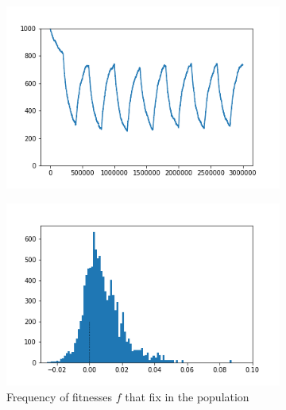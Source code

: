 \documentclass{article}
\begin{document}
\begin{figure}[h]
	\centering
	\begin{subfigure}[t]{0.305\linewidth}
		\centering
		\includegraphics[width = 1.0\linewidth, trim={5 5 40 30}, clip=true]{figures/changing_selection_trajec.png}
		\label{fig:changing_constant_trajec}	
	\end{subfigure}
	\hspace{0.03\linewidth}
	\begin{subfigure}[t]{0.305\linewidth}
		\centering
		\includegraphics[width = 1.0\linewidth, trim={10 5 40 30}, clip=true]{figures/changing_selection_hist2.png}
		\caption{Frequency of fitnesses $f$ that fix in the population}
		\label{fig:changing_constant_hist}
	\hspace{0.03\linewidth}
	\end{subfigure}
	\begin{subfigure}[t]{0.305\linewidth}

\end{subfigure}
\end{figure}
\end{document}
